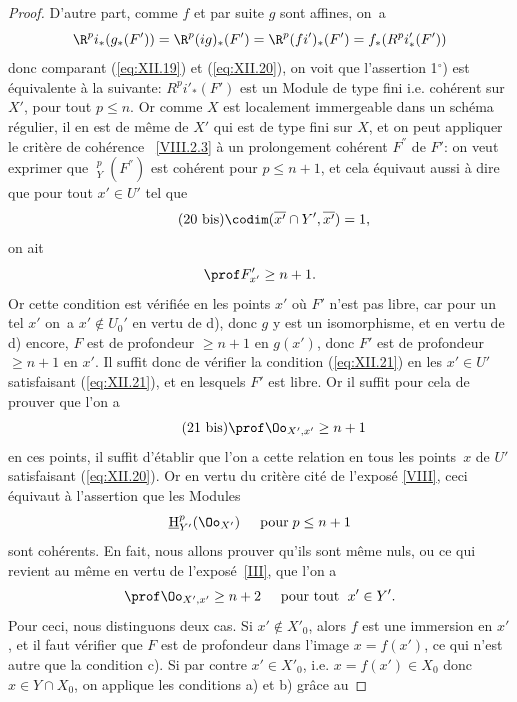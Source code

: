 \begin{proof}
D'autre part, comme $f$ et par suite $g$ sont affines, on~a
\steco
\begin{equation} \label{eq:XII.20} {}\R^pi_\ast(g_\ast(F')) = \R^p(ig)_\ast(F') = \R^p(fi')_\ast(F') = f_\ast(R^pi'_\ast(F'))
\end{equation}
donc comparant (\ref{eq:XII.19}) et (\ref{eq:XII.20}), on voit que l'assertion 1${}^\circ$) est \'equivalente \`a la suivante: $R^pi'_\ast(F')$ est un Module de type fini i.e. coh\'erent sur $X'$, pour tout $p\leq n$. Or comme $X$ est localement immergeable dans un sch\'ema r\'egulier, il en est de m\^eme de $X'$ qui est de type fini sur $X$, et on peut appliquer le crit\`ere de coh\'erence \ignorespaces~\ref{VIII.2.3} \`a un prolongement coh\'erent $F^{''}$ de $F'$: on veut exprimer que $\mathop{\underline{\mathrm{H}}}\nolimits^p_Y(F^{''})$ est coh\'erent pour $p\leq n+1$, et cela \'equivaut aussi \`a dire que pour tout $x'\in U'$ tel que
\begin{equation*} \label{eq:XII.20bis} \tag{20 bis} {}\codim (\overline{x'}\cap Y', \overline{x'})=1,
\end{equation*}
on ait
\steco
\begin{equation} \label{eq:XII.21} {} \prof F'_{x'}\geq n+1.
\end{equation}
Or cette condition est v\'erifi\'ee en les points $x'$ o\`u $F'$ n'est pas libre, car pour un tel $x'$ on~a $x'\notin U_0'$ en vertu de d), donc $g$ y est un isomorphisme, et en vertu de d) encore, $F$ est de profondeur $\geq n+1$ en $g(x')$, donc $F'$ est de profondeur $\geq n+1$ en $x'$. Il suffit donc de v\'erifier la condition (\ref{eq:XII.21}) en les $x'\in U'$ satisfaisant (\ref{eq:XII.21}), et en lesquels $F'$ est libre. Or il suffit pour cela de prouver que l'on a
\begin{equation*} \label{eq:XII.21bis} \tag{21 bis}
\prof \Oo_{X', x'}\geq n+1
\end{equation*}
\enlargethispage{\baselineskip}%
en ces points, \afortiori il suffit d'\'etablir que l'on a cette relation en tous les points~$x$ de $U'$ satisfaisant (\ref{eq:XII.20}). Or en vertu du crit\`ere cit\'e de l'expos\'e \ref{VIII}, ceci \'equivaut \`a l'assertion que les Modules
\[
\mathop{\underline{\mathrm{H}}}\nolimits^p_{Y'}(\Oo_{X'}) \hspace{5mm} \text{pour} \; p\leq n+1
\]
sont coh\'erents. En fait, nous allons prouver qu'ils sont m\^eme nuls, ou ce qui revient au m\^eme en vertu de l'expos\'e~\ref{III}, que l'on a
\steco
\begin{equation} \label{eq:XII.22} {} \prof \Oo_{X', x'}\geq n+2 \hspace{5mm} \text{pour tout }\; x'\in Y'.
\end{equation}
Pour ceci, nous distinguons deux cas. Si $x'\notin X'_0$, alors $f$ est une immersion en $x'$, et il faut v\'erifier que $F$ est de profondeur dans l'image $x=f(x')$, ce qui n'est autre que la condition c). Si par contre $x'\in X'_0$, i.e. $x=f(x')\in X_0$ donc $x\in Y\cap X_0$, on applique les conditions a) et b) gr\^ace au


\end{proof}
